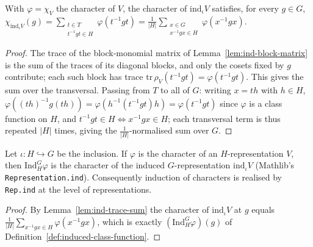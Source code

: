 \begin{lemma}
    \label{lem:ind-trace-sum}
    With $\varphi = \chi_V$ the character of $V$, the character of
    $\mathrm{ind}_\iota V$ satisfies, for every $g \in G$,
    $\chi_{\mathrm{ind}_\iota V}(g) = \sum_{\substack{t \in T \\ t^{-1} g t \in H}}
    \varphi(t^{-1} g t) = \frac{1}{|H|} \sum_{\substack{x \in G \\ x^{-1} g x \in
    H}} \varphi(x^{-1} g x)$.
\end{lemma}
\begin{proof}
    The trace of the block-monomial matrix of
    Lemma~\ref{lem:ind-block-matrix} is the sum of the traces of its diagonal
    blocks, and only the cosets fixed by $g$ contribute; each such block has trace
    $\mathrm{tr}\,\rho_V(t^{-1} g t) = \varphi(t^{-1} g t)$. This gives the sum
    over the transversal. Passing from $T$ to all of $G$: writing $x = t h$ with
    $h \in H$, $\varphi((th)^{-1} g (th)) = \varphi(h^{-1}(t^{-1} g t) h) =
    \varphi(t^{-1} g t)$ since $\varphi$ is a class function on $H$, and
    $t^{-1} g t \in H \iff x^{-1} g x \in H$; each transversal term is thus
    repeated $|H|$ times, giving the $\frac{1}{|H|}$-normalised sum over $G$.
\end{proof}

\begin{lemma}
    \label{lem:induced-is-char-of-ind}
    \leanok
    Let $\iota : H \hookrightarrow G$ be the inclusion. If $\varphi$ is the
    character of an $H$-representation $V$, then $\mathrm{Ind}_H^G \varphi$ is the
    character of the induced $G$-representation $\mathrm{ind}_\iota V$ (Mathlib's
    \texttt{Representation.ind}). Consequently induction of characters is realised
    by \texttt{Rep.ind} at the level of representations.
\end{lemma}
\begin{proof}
    By Lemma~\ref{lem:ind-trace-sum} the character of $\mathrm{ind}_\iota V$ at
    $g$ equals $\frac{1}{|H|}\sum_{x^{-1} g x \in H}\varphi(x^{-1} g x)$, which is
    exactly $(\mathrm{Ind}_H^G \varphi)(g)$ of
    Definition~\ref{def:induced-class-function}.
\end{proof}

